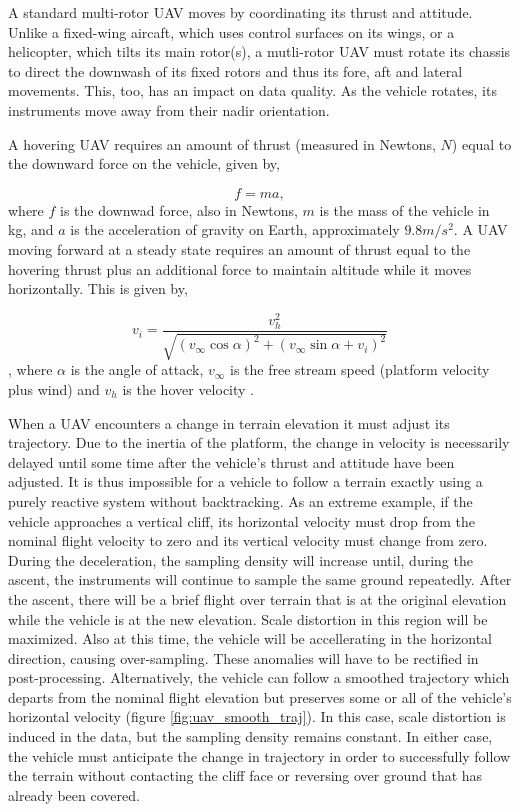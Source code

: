 \documentclass[10pt,a4paper]{report}
\begin{document}
A standard multi-rotor UAV moves by coordinating its thrust and attitude. Unlike a fixed-wing aircaft, which uses control surfaces on its wings, or a helicopter, which tilts its main rotor(s), a mutli-rotor UAV must rotate its chassis to direct the downwash of its fixed rotors and thus its fore, aft and lateral movements. This, too, has an impact on data quality. As the vehicle rotates, its instruments move away from their nadir orientation. 

A hovering UAV requires an amount of thrust (measured in Newtons, $N$) equal to the downward force on the vehicle, given by, 

\begin{equation}
f = ma,
\label{eq:hover_force}
\end{equation} where $f$ is the downwad force, also in Newtons, $m$ is the mass of the vehicle in kg, and $a$ is the acceleration of gravity on Earth, approximately $9.8m/s^2$. A UAV moving forward at a steady state requires an amount of thrust equal to the hovering thrust plus an additional force to maintain altitude while it moves horizontally. This is given by,

\begin{equation}
v_i = \dfrac{ v_h^2 } { \sqrt{ (v_\infty \cos \alpha)^2 + (v_\infty \sin \alpha + v_i)^2 } } 
\label{eq:move_force}
\end{equation}, where $\alpha$ is the angle of attack, $v_\infty$ is the free stream speed (platform velocity plus wind) and $v_h$ is the hover velocity \cite{Hoffmann2007}.

When a UAV encounters a change in terrain elevation it must adjust its trajectory. Due to the inertia of the platform, the change in velocity is  necessarily delayed until some time after the vehicle's thrust and attitude have been adjusted. It is thus impossible for a vehicle to follow a terrain exactly using a purely reactive system without backtracking. As an extreme example, if the vehicle approaches a vertical cliff, its horizontal velocity must drop from the nominal flight velocity to zero and its vertical velocity must change from zero. During the deceleration, the sampling density will increase until, during the ascent, the instruments will continue to sample the same ground repeatedly. After the ascent, there will be a brief flight over terrain that is at the original elevation while the vehicle is at the new elevation. Scale distortion in this region will be maximized. Also at this time, the vehicle will be accellerating in the horizontal direction, causing over-sampling. These anomalies will have to be rectified in post-processing. Alternatively, the vehicle can follow a smoothed trajectory which departs from the nominal flight elevation but preserves some or all of the vehicle's horizontal velocity (figure \ref{fig:uav_smooth_traj}). In this case, scale distortion is induced in the data, but the sampling density remains constant. In either case, the vehicle must anticipate the change in trajectory in order to successfully follow the terrain without contacting the cliff face or reversing over ground that has already been covered.
\end{document}
